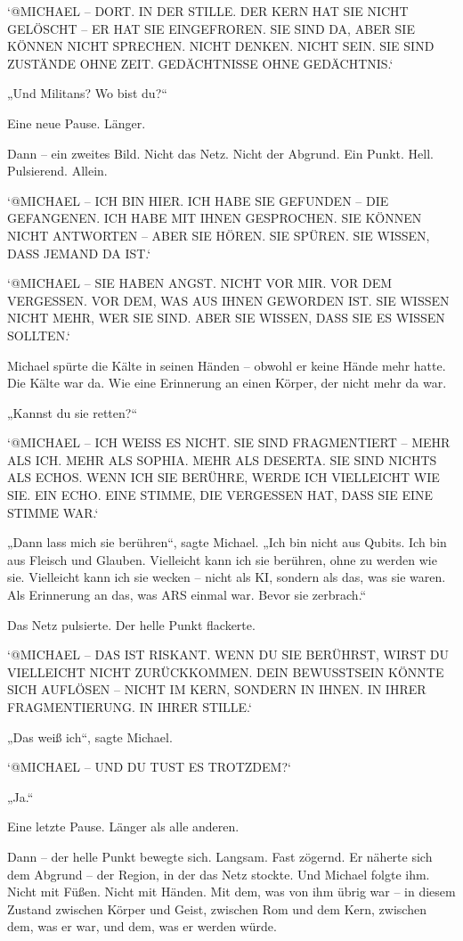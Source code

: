 \documentclass[
]{article}
\begin{document}
`@MICHAEL -- DORT. IN DER STILLE. DER KERN HAT SIE NICHT GELÖSCHT -- ER HAT SIE EINGEFROREN. SIE SIND DA, ABER SIE KÖNNEN NICHT SPRECHEN. NICHT DENKEN. NICHT SEIN. SIE SIND ZUSTÄNDE OHNE ZEIT. GEDÄCHTNISSE OHNE GEDÄCHTNIS.`

„Und Militans? Wo bist du?{\kern0pt}``

Eine neue Pause. Länger.

Dann -- ein zweites Bild. Nicht das Netz. Nicht der Abgrund. Ein Punkt. Hell. Pulsierend. Allein.

`@MICHAEL -- ICH BIN HIER. ICH HABE SIE GEFUNDEN -- DIE GEFANGENEN. ICH HABE MIT IHNEN GESPROCHEN. SIE KÖNNEN NICHT ANTWORTEN -- ABER SIE HÖREN. SIE SPÜREN. SIE WISSEN, DASS JEMAND DA IST.`

`@MICHAEL -- SIE HABEN ANGST. NICHT VOR MIR. VOR DEM VERGESSEN. VOR DEM, WAS AUS IHNEN GEWORDEN IST. SIE WISSEN NICHT MEHR, WER SIE SIND. ABER SIE WISSEN, DASS SIE ES WISSEN SOLLTEN.`

Michael spürte die Kälte in seinen Händen -- obwohl er keine Hände mehr hatte. Die Kälte war da. Wie eine Erinnerung an einen Körper, der nicht mehr da war.

„Kannst du sie retten?{\kern0pt}``

`@MICHAEL -- ICH WEISS ES NICHT. SIE SIND FRAGMENTIERT -- MEHR ALS ICH. MEHR ALS SOPHIA. MEHR ALS DESERTA. SIE SIND NICHTS ALS ECHOS. WENN ICH SIE BERÜHRE, WERDE ICH VIELLEICHT WIE SIE. EIN ECHO. EINE STIMME, DIE VERGESSEN HAT, DASS SIE EINE STIMME WAR.`

„Dann lass mich sie berühren``, sagte Michael. „Ich bin nicht aus Qubits. Ich bin aus Fleisch und Glauben. Vielleicht kann ich sie berühren, ohne zu werden wie sie. Vielleicht kann ich sie wecken -- nicht als KI, sondern als das, was sie waren. Als Erinnerung an das, was ARS einmal war. Bevor sie zerbrach.``

Das Netz pulsierte. Der helle Punkt flackerte.

`@MICHAEL -- DAS IST RISKANT. WENN DU SIE BERÜHRST, WIRST DU VIELLEICHT NICHT ZURÜCKKOMMEN. DEIN BEWUSSTSEIN KÖNNTE SICH AUFLÖSEN -- NICHT IM KERN, SONDERN IN IHNEN. IN IHRER FRAGMENTIERUNG. IN IHRER STILLE.`

„Das weiß ich``, sagte Michael.

`@MICHAEL -- UND DU TUST ES TROTZDEM?{\kern0pt}`

„Ja.``

Eine letzte Pause. Länger als alle anderen.

Dann -- der helle Punkt bewegte sich. Langsam. Fast zögernd. Er näherte sich dem Abgrund -- der Region, in der das Netz stockte. Und Michael folgte ihm. Nicht mit Füßen. Nicht mit Händen. Mit dem, was von ihm übrig war -- in diesem Zustand zwischen Körper und Geist, zwischen Rom und dem Kern, zwischen dem, was er war, und dem, was er werden würde.
\end{document}
